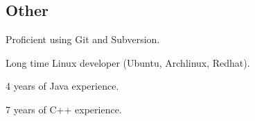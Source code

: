 \documentclass{resume}
\begin{document}
\subsection{Other}
\begin{compactitem}
  \item Proficient using Git and Subversion.
  \item Long time Linux developer (Ubuntu, Archlinux, Redhat).
  \item 4 years of Java experience.
  \item 7 years of C++ experience.
\end{compactitem}
\end{document}
